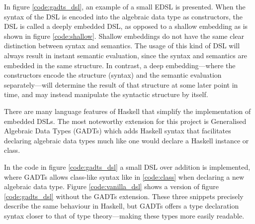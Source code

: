 In figure \ref{code:gadts_dsl}, an example of a small \gls{EDSL} is presented. When the syntax of the \gls{DSL} is encoded into the algebraic data type as constructors, the \gls{DSL} is called a deeply embedded \gls{DSL}, as opposed to a shallow embedding as is shown in figure \ref{code:shallow}. Shallow embeddings do not have the same clear distinction between syntax and semantics. The usage of this kind of \gls{DSL} will always result in instant semantic evaluation, since the syntax and semantics are embedded in the same structure. In contrast, a deep embedding---where the constructors encode the structure (syntax) and the semantic evaluation separately---will determine the result of that structure at some later point in time, and may instead manipulate the syntactic structure by itself. %


There are many language features of \gls{Haskell} that simplify the implementation of embedded \gls{DSL}s. %
The most noteworthy extension for this project is \gls{Generalised Algebraic Data Types} (\gls{GADTs}) which adds \gls{Haskell} syntax that facilitates declaring algebraic data types much like one would declare a \gls{Haskell} instance or class.

In the code in figure \ref{code:gadts_dsl} a small \gls{DSL} over addition is implemented, where \gls{GADTs} allows class-like syntax like in \ref{code:class} when declaring a new algebraic data type.
Figure \ref{code:vanilla_dsl} shows a version of figure \ref{code:gadts_dsl} without the \gls{GADTs} extension. These three snippets precisely describe the same behaviour in \gls{Haskell}, but \gls{GADTs} offers a type declaration syntax closer to that of type theory---making these types more easily readable. 


